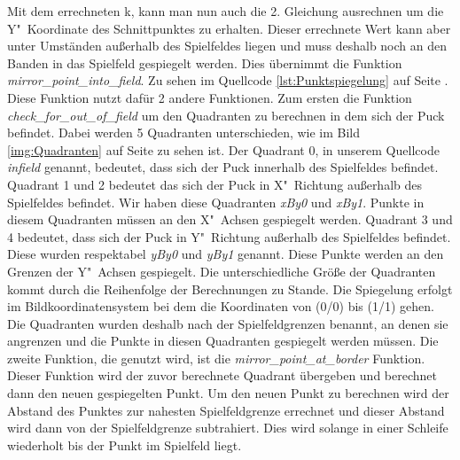 Mit dem errechneten k, kann man nun auch die 2. Gleichung ausrechnen um die Y"~Koordinate des Schnittpunktes zu erhalten. Dieser errechnete Wert kann aber unter Umständen außerhalb des Spielfeldes liegen und muss deshalb noch an den Banden in das Spielfeld gespiegelt werden. Dies übernimmt die Funktion \textit{mirror\_point\_into\_field}. Zu sehen im Quellcode \ref{lst:Punktspiegelung} auf Seite \pageref{lst:Punktspiegelung}. Diese Funktion nutzt dafür 2 andere Funktionen. Zum ersten die Funktion \textit{check\_for\_out\_of\_field} um den Quadranten zu berechnen in dem sich der Puck befindet. Dabei werden 5 Quadranten unterschieden, wie im Bild \ref{img:Quadranten} auf Seite \pageref{img:Quadranten} zu sehen ist. Der Quadrant 0, in unserem Quellcode \textit{infield} genannt, bedeutet, dass sich der Puck innerhalb des Spielfeldes befindet. Quadrant 1 und 2 bedeutet das sich der Puck in X"~Richtung außerhalb des Spielfeldes befindet. Wir haben diese Quadranten \textit{xBy0} und \textit{xBy1}. Punkte in diesem Quadranten müssen an den X"~Achsen gespiegelt werden. Quadrant 3 und 4 bedeutet, dass sich der Puck in Y"~Richtung außerhalb des Spielfeldes befindet. Diese wurden respektabel \textit{yBy0} und \textit{yBy1} genannt. Diese Punkte werden an den Grenzen der Y"~Achsen gespiegelt. Die unterschiedliche Größe der Quadranten kommt durch die Reihenfolge der Berechnungen zu Stande. Die Spiegelung erfolgt im Bildkoordinatensystem bei dem die Koordinaten von (0/0) bis (1/1) gehen. Die Quadranten wurden deshalb nach der Spielfeldgrenzen benannt, an denen sie angrenzen und die Punkte in diesen Quadranten gespiegelt werden müssen.
Die zweite Funktion, die genutzt wird, ist die \textit{mirror\_point\_at\_border} Funktion. Dieser Funktion wird der zuvor berechnete Quadrant übergeben und berechnet dann den neuen gespiegelten Punkt. Um den neuen Punkt zu berechnen wird der Abstand des Punktes zur nahesten Spielfeldgrenze errechnet und dieser Abstand wird dann von der Spielfeldgrenze subtrahiert. Dies wird solange in einer Schleife wiederholt bis der Punkt im Spielfeld liegt.
